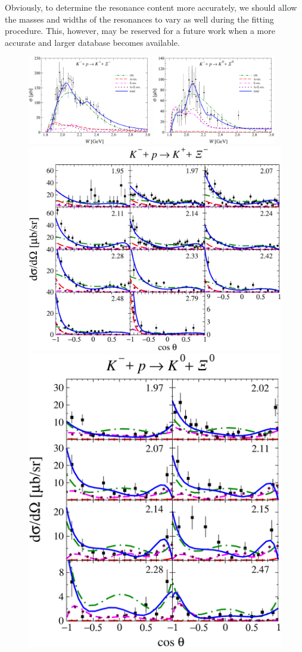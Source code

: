 \documentclass[10pt,aps,prc,superscriptaddress,twoside,twocolumn,nofootinbib,showpacs,preprintnumbers]{revtex4-1}
\begin{document}
Obviously, to determine the resonance content more accurately, we should allow the masses and widths of the resonances to vary as well during the fitting procedure. This, however, may be reserved for a future work when a more accurate and larger database becomes available.


\begin{figure}[t] \centering
\includegraphics[width=0.48\textwidth,clip=1]{txsc1_lasso_pruned_3sigma_BackwardAS_lambda-5_scaledgwidth_no493_g_initial-1_a.pdf} \quad
\includegraphics[width=0.48\textwidth,clip=1]{txsc2_lasso_pruned_3sigma_BackwardAS_lambda-5_scaledgwidth_no493_g_initial-1_a.pdf}
\qquad
\includegraphics[height=0.31\textwidth,clip=1]{dxsc1_lasso_pruned_3sigma_BackwardAS_lambda-5_scaledgwidth_no493_g_initial-1_a.pdf}
\includegraphics[height=0.31\textwidth,clip=1]{dxsc2_lasso_pruned_3sigma_BackwardAS_lambda-5_scaledgwidth_no493_g_initial-1_a.pdf}

\end{figure}
\end{document}
